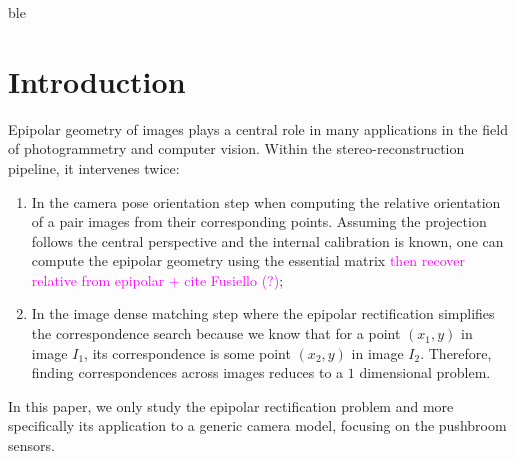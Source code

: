 \documentclass{ipol}
\newcommand{\mpd}[1]{\textcolor{magenta}{#1}}
\begin{document}
\begin{ipolAbstract}
ble
\end{ipolAbstract}


\section{Introduction}
Epipolar geometry of images plays a central role in many applications in the field of photogrammetry and computer vision. Within the stereo-reconstruction pipeline, it intervenes twice:

\begin{enumerate}
   \item In the camera pose orientation step when computing the
      relative orientation of a pair images from their corresponding points. Assuming 
      the projection follows the central perspective and the internal calibration is known,
      one can compute the epipolar geometry using the essential matrix
      \mpd{then recover relative from epipolar + cite Fusiello (?)};
   \item In the image dense matching step where the epipolar rectification simplifies the 
       correspondence search because we know
        that for a point $(x_1,y)$ in image $I_1$, its correspondence is some point
        $(x_2,y)$ in image $I_2$. Therefore, finding correspondences across images reduces to 
        a $1$ dimensional problem.
\end{enumerate}

\noindent In this paper, we only study  the epipolar rectification problem and more specifically
its application to a generic camera model, focusing on the pushbroom sensors.
\end{document}
